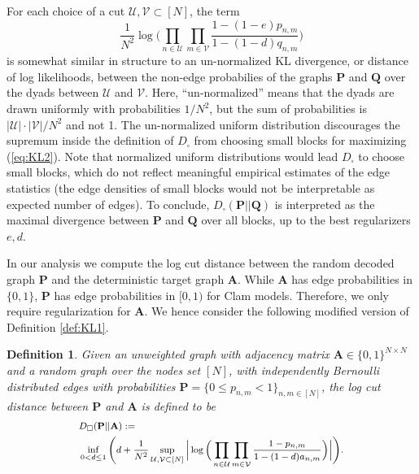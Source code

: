 \documentclass[letterpaper]{article} %
\newtheorem{definition}[theorem]{Definition}
\newcommand{\ron}[1]{{{\textcolor{red}{\textbf{[Ron:} {#1}\textbf{]}}}}}
\begin{document}
For each choice of a cut $\mathcal{U},\mathcal{V}\subset[N]$,  the term
 \begin{equation}
 \label{eq:KL2}
     \frac{1}{N^2}\log\Big(\prod_{n\in \mathcal{U}}\prod_{m\in \mathcal{V}}
\frac{1-(1-e)p_{n,m}}{1-(1-d)q_{n,m}}\Big)
 \end{equation}
is somewhat similar in structure to an un-normalized KL divergence, or distance of log likelihoods, between the non-edge probabilies of the graphs $\mathbf{P}$ and $\mathbf{Q}$ over the dyads between  $\mathcal{U}$ and $\mathcal{V}$. Here, ``un-normalized'' means that the dyads are drawn  uniformly with probabilities $1/N^2$, but the sum of probabilities is $|\mathcal{U}|\cdot|\mathcal{V}|/N^2$ and not 1. The un-normalized uniform distribution discourages the supremum inside the definition of $D_{\square}$ from choosing small blocks for maximizing (\ref{eq:KL2}). Note that normalized uniform distributions would lead $D_{\square}$ to choose  small blocks, which do not reflect meaningful empirical estimates of the edge statistics (the edge densities of small blocks would not be interpretable as expected number of edges). To conclude, $D_{\square}(\mathbf{P} || \mathbf{Q})$ is interpreted as the maximal divergence between $\mathbf{P}$ and $\mathbf{Q}$ over all blocks, up to the best regularizers $e,d$.

In our analysis we compute the log cut distance between the random decoded graph $\mathbf{P}$ and the deterministic target graph $\mathbf{A}$. While $\mathbf{A}$ has edge probabilities in $\{0,1\}$, $\mathbf{P}$ has edge probabilities in $[0,1)$ for Clam models. Therefore, we only require regularization  for $\mathbf{A}$. We hence consider the following modified version of Definition \ref{def:KL1}.
\begin{definition}
\label{def:KL2}
Given an unweighted graph with adjacency matrix $\mathbf{A}\in\{0,1\}^{N\times N}$ and a random graph over the nodes set $[N]$, with independently Bernoulli distributed edges with probabilities $\mathbf{P}=\{0\leq p_{n,m}<1\}_{n,m\in[N]}$, the \emph{log cut distance} between $\mathbf{P}$ and $\mathbf{A}$ is defined to be
    \[\footnotesize
    \begin{split}
    & D_{\square}(\mathbf{P} || \mathbf{A}):= \\
    & \inf_{0< d\leq1} \Bigg( d+ \frac{1}{N^2}\sup_{\mathcal{U},\mathcal{V}\subset[N]}\Big|\log\Big(\prod_{n\in \mathcal{U}}\prod_{m\in \mathcal{V}}
\frac{1-p_{n,m}}{1-(1-d)a_{n,m}}\Big)\Big|\Bigg).
\end{split}\]
\end{definition}
\end{document}

